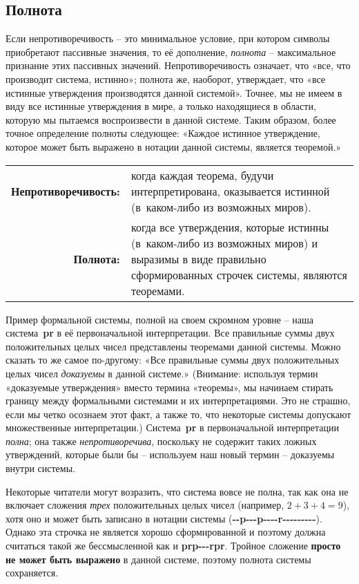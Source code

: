 \documentclass[../main.tex]{subfiles}
\begin{document}
\subsection{Полнота}

Если непротиворечивость \--- это минимальное условие, при котором символы приобретают пассивные значения, то её дополнение, \emph{полнота} \--- максимальное признание этих пассивных значений. Непротиворечивость означает, что «все, что производит система, истинно»; полнота же, наоборот, утверждает, что «все истинные утверждения производятся данной системой». Точнее, мы не имеем в виду все истинные утверждения в мире, а только находящиеся в области, которую мы пытаемся воспроизвести в данной системе. Таким образом, более точное определение полноты следующее: «Каждое истинное утверждение, которое может быть выражено в нотации данной системы, является теоремой.»

\medskip
\noindent\begin{tabularx}{\textwidth}{ @{\quad} r @{~~} >{\RaggedRight}X @{\quad} }
    \textbf{Непротиворечивость:} & когда каждая теорема, будучи интерпретирована, оказывается истинной (в~каком-либо из возможных миров). \\
    \textbf{Полнота:} & когда все утверждения, которые истинны (в~каком-либо из возможных миров) и выразимы в виде правильно сформированных строчек системы, являются теоремами.
\end{tabularx}
\medskip

Пример формальной системы, полной на своем скромном уровне \--- наша система~\textbf{pr} в её первоначальной интерпретации. Все правильные суммы двух положительных целых чисел представлены теоремами данной системы. Можно сказать то же самое по-другому: «Все правильные суммы двух положительных целых чисел \emph{доказуемы} в данной системе.» (Внимание: используя термин «доказуемые утверждения» вместо термина «теоремы», мы начинаем стирать границу между формальными системами и их интерпретациями. Это не страшно, если мы четко осознаем этот факт, а также то, что некоторые системы допускают множественные интерпретации.) Система~\textbf{pr} в первоначальной интерпретации \emph{полна}; она также \emph{непротиворечива}, поскольку не содержит таких ложных утверждений, которые были бы \--- используем наш новый термин \--- доказуемы внутри системы.

Некоторые читатели могут возразить, что система вовсе не полна, так как она не включает сложения \emph{трех} положительных целых чисел (например, $2+3+4=9$), хотя оно и может быть записано в нотации системы (\textbf{-{}-p-{}-{}-p-{}-{}-{}-r-{}-{}-{}-{}-{}-{}-{}-{}-}). Однако эта строчка не является хорошо сформированной и поэтому должна считаться такой же бессмысленной как и \textbf{prp-{}-{}-rpr}. Тройное сложение \textbf{просто не может быть выражено} в данной системе, поэтому полнота системы сохраняется.
\end{document}
